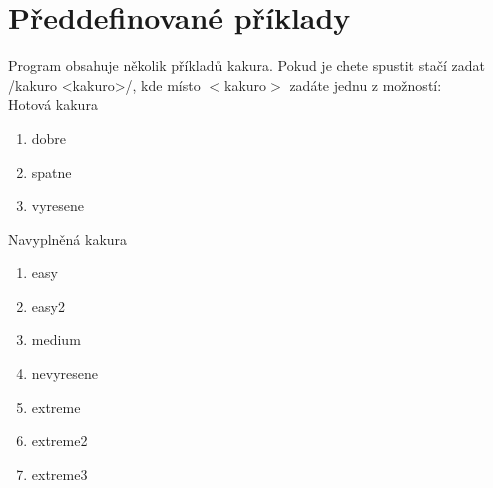 \section*{Předdefinované příklady}
Program obsahuje několik příkladů kakura.
Pokud je chete spustit stačí zadat \haskellline/kakuro <kakuro>/, kde místo $<$kakuro$>$ zadáte jednu z možností:\\
Hotová kakura
\begin{enumerate}
\item dobre
\item spatne
\item vyresene
\end{enumerate}
Navyplněná kakura
\begin{enumerate}
\item easy
\item easy2
\item medium
\item nevyresene
\item extreme
\item extreme2
\item extreme3
\end{enumerate}